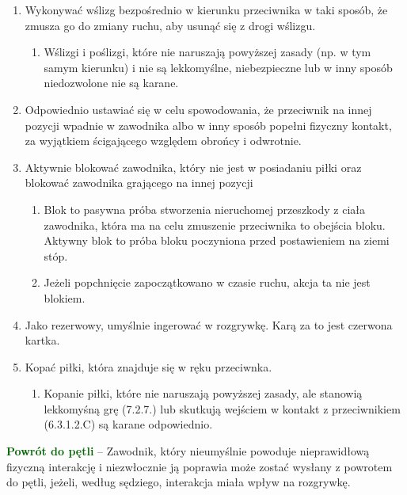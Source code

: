 \documentclass[12pt]{article}
\newcommand\other[1]{\bgroup\textcolor{darkgreen}{\textbf{#1}}}
\begin{document}
\begin{enumerate}
	\item
	      Wykonywać wślizg bezpośrednio w kierunku przeciwnika w taki sposób, że
	      zmusza go do zmiany ruchu, aby usunąć się z drogi wślizgu.

	      \begin{enumerate}
		      \item
		            Wślizgi i poślizgi, które nie naruszają powyższej zasady (np. w tym
		            samym kierunku) i nie są lekkomyślne, niebezpieczne lub w inny
		            sposób niedozwolone nie są karane.
	      \end{enumerate}
	\item
	      Odpowiednio ustawiać się w celu spowodowania, że przeciwnik na innej
	      pozycji wpadnie w zawodnika albo w inny sposób popełni fizyczny
	      kontakt, za wyjątkiem ścigającego względem obrońcy i odwrotnie.
	\item
	      Aktywnie blokować zawodnika, który nie jest w posiadaniu piłki oraz
	      blokować zawodnika grającego na innej pozycji

	      \begin{enumerate}
		      \item
		            Blok to pasywna próba stworzenia nieruchomej przeszkody z ciała
		            zawodnika, która ma na celu zmuszenie przeciwnika to obejścia bloku.
		            Aktywny blok to próba bloku poczyniona przed postawieniem na ziemi
		            stóp.
		      \item
		            Jeżeli popchnięcie zapoczątkowano w czasie ruchu, akcja ta nie jest
		            blokiem.
	      \end{enumerate}
	\item
	      Jako rezerwowy, umyślnie ingerować w rozgrywkę. Karą za to jest
	      czerwona kartka.
	\item
	      Kopać piłki, która znajduje się w ręku przeciwnka.

	      \begin{enumerate}
		      \item
		            Kopanie piłki, które nie naruszają powyższej zasady, ale stanowią
		            lekkomyśną grę (7.2.7.) lub skutkują wejściem w kontakt z
		            przeciwnikiem (6.3.1.2.C) są karane odpowiednio.
	      \end{enumerate}
\end{enumerate}

\other{Powrót do pętli} -- Zawodnik, który nieumyślnie powoduje
nieprawidłową fizyczną interakcję i niezwłocznie ją poprawia może zostać
wysłany z powrotem do pętli, jeżeli, według sędziego, interakcja miała
wpływ na rozgrywkę.
\end{document}
